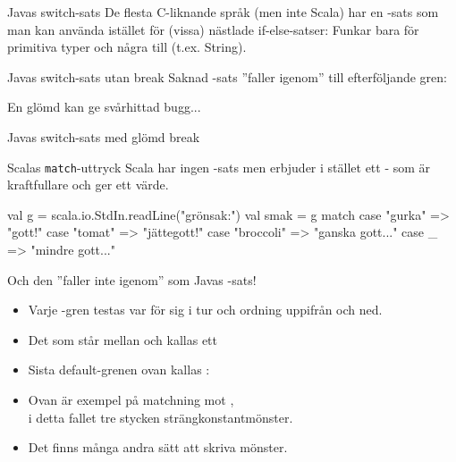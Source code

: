 \begin{Slide}{Javas switch-sats}\SlideFontSmall
De flesta C-liknande språk (men inte Scala) har en -sats som man kan använda istället för (vissa) nästlade if-else-satser: 
Funkar bara för primitiva typer och några till (t.ex. String).
\end{Slide}

\ifkompendium\else
\begin{Slide}{Javas switch-sats utan break}\SlideFontSmall
Saknad -sats ''faller igenom'' till efterföljande gren: 

En glömd  kan ge svårhittad bugg... 
\end{Slide}

\begin{Slide}{Javas switch-sats med glömd break}\SlideFontSmall

\vspace{-0.5em}

\vspace{-0.7em}\pause
{}

\end{Slide}


\begin{Slide}{Scalas \texttt{match}-uttryck}\SlideFontSmall
Scala har ingen -sats men erbjuder i stället ett - som är kraftfullare och ger ett värde.

\begin{Code}
val g = scala.io.StdIn.readLine("grönsak:")
val smak = g match {
  case "gurka" => "gott!"
  case "tomat" => "jättegott!"
  case "broccoli" => "ganska gott..."
  case _ => "mindre gott..."
}
\end{Code}
Och den ''faller inte igenom'' som Javas -sats! 
\begin{itemize}
\pause\item Varje -gren testas var för sig i tur och ordning uppifrån och ned.
\pause\item Det som står mellan  och \code{=>} kallas ett  
\pause\item Sista default-grenen ovan kallas :  
\pause\item Ovan är exempel på matchning mot , \\ i detta fallet tre stycken strängkonstantmönster.
\pause\item Det finns många andra sätt att skriva mönster.
\end{itemize}
\end{Slide}



